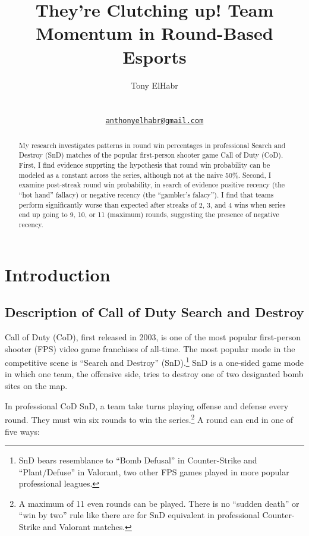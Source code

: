 \documentclass{article}
\title{They're Clutching up! Team Momentum in Round-Based Esports}
\author{
    Tony ElHabr
   \\
     \\
   \\
  \texttt{\href{mailto:anthonyelhabr@gmail.com}{\nolinkurl{anthonyelhabr@gmail.com}}} \\
  }
\begin{document}
\maketitle


\begin{abstract}
My research investigates patterns in round win percentages in
professional Search and Destroy (SnD) matches of the popular
first-person shooter game Call of Duty (CoD). First, I find evidence
supprting the hypothesis that round win probability can be modeled as a
constant across the series, although not at the naive 50\%. Second, I
examine post-streak round win probability, in search of evidence
positive recency (the ``hot hand'' fallacy) or negative recency (the
``gambler's falacy''). I find that teams perform significantly worse
than expected after streaks of 2, 3, and 4 wins when series end up going
to 9, 10, or 11 (maximum) rounds, suggesting the presence of negative
recency.
\end{abstract}


\hypertarget{introduction}{%
\section{Introduction}\label{introduction}}

\hypertarget{description-of-call-of-duty-search-and-destroy}{%
\subsection{Description of Call of Duty Search and
Destroy}\label{description-of-call-of-duty-search-and-destroy}}

Call of Duty (CoD), first released in 2003, is one of the most popular
first-person shooter (FPS) video game franchises of all-time. The most
popular mode in the competitive scene is ``Search and Destroy''
(SnD).\footnote{SnD bears resemblance to ``Bomb Defusal'' in
  Counter-Strike and ``Plant/Defuse'' in Valorant, two other FPS games
  played in more popular professional leagues.} SnD is a one-sided game
mode in which one team, the offensive side, tries to destroy one of two
designated bomb sites on the map.

In professional CoD SnD, a team take turns playing offense and defense
every round. They must win six rounds to win the series.\footnote{A
  maximum of 11 even rounds can be played. There is no ``sudden death''
  or ``win by two'' rule like there are for SnD equivalent in
  professional Counter-Strike and Valorant matches.} A round can end in
one of five ways:
\end{document}
